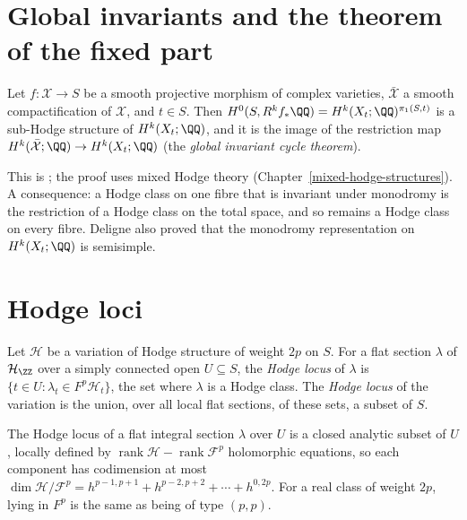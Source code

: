 \section{Global invariants and the theorem of the fixed part}\label{vhs:section-fixed-part}

\begin{theorem}\label{vhs:theorem-fixed-part}
Let $f \colon \mathcal{X} \to S$ be a smooth projective morphism of complex varieties, $\bar{\mathcal{X}}$ a smooth compactification of $\mathcal{X}$, and $t \in S$. Then
$H^0(S, R^kf_*\QQ) = H^k(X_t; \QQ)^{\pi_1(S, t)}$ is a sub-Hodge structure of $H^k(X_t; \QQ)$, and it is the image of the restriction map $H^k(\bar{\mathcal{X}}; \QQ) \to H^k(X_t; \QQ)$
(the \emph{global invariant cycle theorem}).
\end{theorem}

This is \cite[Th\'eor\`eme 4.1.1 and Corollaire 4.1.2]{deligne-hodge-2}; the proof uses mixed Hodge theory (Chapter~\ref{mixed-hodge-structures}). A consequence: a Hodge class on one fibre that
is invariant under monodromy is the restriction of a Hodge class on the total space, and so remains a Hodge class on every fibre. Deligne also proved that the monodromy representation
on $H^k(X_t; \QQ)$ is semisimple.

\section{Hodge loci}\label{vhs:section-hodge-loci}

\begin{definition}\label{vhs:definition-hodge-locus}
Let $\mathcal{H}$ be a variation of Hodge structure of weight $2p$ on $S$. For a flat section $\lambda$ of $\mathcal{H}_\ZZ$ over a simply connected open $U \subseteq S$, the \emph{Hodge locus} of $\lambda$
is $\{t \in U : \lambda_t \in F^p\mathcal{H}_t\}$, the set where $\lambda$ is a Hodge class. The \emph{Hodge locus} of the variation is the union, over all local flat sections, of these sets, a subset of
$S$.
\end{definition}

\begin{proposition}\label{vhs:proposition-hodge-locus-analytic}
The Hodge locus of a flat integral section $\lambda$ over $U$ is a closed analytic subset of $U$, locally defined by $\operatorname{rank}\mathcal{H} - \operatorname{rank}\mathcal{F}^p$ holomorphic equations, so each
component has codimension at most $\dim\mathcal{H}/\mathcal{F}^p = h^{p-1,p+1} + h^{p-2,p+2} + \cdots + h^{0,2p}$. For a real class of weight $2p$, lying in $F^p$ is the same as being of type $(p,p)$.
\end{proposition}

